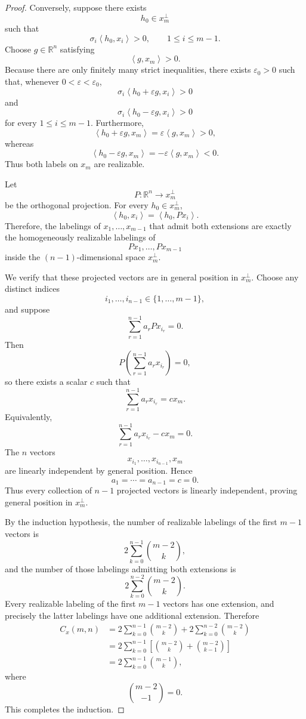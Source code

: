 \documentclass[11pt]{article}
\newcommand{\R}{\mathbb{R}}
\newcommand{\ip}[2]{\left\langle #1,#2\right\rangle}
\newcommand{\1}{\mathbf{1}}
\begin{document}
\begin{proof}
Conversely, suppose there exists
\[
h_0\in x_m^\perp
\]
such that
\[
\sigma_i\ip{h_0}{x_i}>0,
\qquad
1\le i\le m-1.
\]
Choose \(g\in\R^n\) satisfying
\[
\ip{g}{x_m}>0.
\]
Because there are only finitely many strict inequalities, there exists
\(\varepsilon_0>0\) such that, whenever
\(0<\varepsilon<\varepsilon_0\),
\[
\sigma_i\ip{h_0+\varepsilon g}{x_i}>0
\]
and
\[
\sigma_i\ip{h_0-\varepsilon g}{x_i}>0
\]
for every \(1\le i\le m-1\). Furthermore,
\[
\ip{h_0+\varepsilon g}{x_m}
=
\varepsilon\ip{g}{x_m}>0,
\]
whereas
\[
\ip{h_0-\varepsilon g}{x_m}
=
-\varepsilon\ip{g}{x_m}<0.
\]
Thus both labels on \(x_m\) are realizable.

Let
\[
P:\R^n\to x_m^\perp
\]
be the orthogonal projection. For every \(h_0\in x_m^\perp\),
\[
\ip{h_0}{x_i}
=
\ip{h_0}{Px_i}.
\]
Therefore, the labelings of \(x_1,\dots,x_{m-1}\) that admit both
extensions are exactly the homogeneously realizable labelings of
\[
Px_1,\dots,Px_{m-1}
\]
inside the \((n-1)\)-dimensional space \(x_m^\perp\).

We verify that these projected vectors are in general position in
\(x_m^\perp\). Choose any distinct indices
\[
i_1,\dots,i_{n-1}\in\{1,\dots,m-1\},
\]
and suppose
\[
\sum_{r=1}^{n-1}a_rPx_{i_r}=0.
\]
Then
\[
P\left(
\sum_{r=1}^{n-1}a_rx_{i_r}
\right)=0,
\]
so there exists a scalar \(c\) such that
\[
\sum_{r=1}^{n-1}a_rx_{i_r}=cx_m.
\]
Equivalently,
\[
\sum_{r=1}^{n-1}a_rx_{i_r}-cx_m=0.
\]
The \(n\) vectors
\[
x_{i_1},\dots,x_{i_{n-1}},x_m
\]
are linearly independent by general position. Hence
\[
a_1=\cdots=a_{n-1}=c=0.
\]
Thus every collection of \(n-1\) projected vectors is linearly
independent, proving general position in \(x_m^\perp\).

By the induction hypothesis, the number of realizable labelings of the
first \(m-1\) vectors is
\[
2\sum_{k=0}^{n-1}\binom{m-2}{k},
\]
and the number of those labelings admitting both extensions is
\[
2\sum_{k=0}^{n-2}\binom{m-2}{k}.
\]
Every realizable labeling of the first \(m-1\) vectors has one extension,
and precisely the latter labelings have one additional extension.
Therefore
\begin{align*}
C_x(m,n)
&=
2\sum_{k=0}^{n-1}\binom{m-2}{k}
+
2\sum_{k=0}^{n-2}\binom{m-2}{k}
\\
&=
2\sum_{k=0}^{n-1}
\left[
\binom{m-2}{k}
+
\binom{m-2}{k-1}
\right]
\\
&=
2\sum_{k=0}^{n-1}\binom{m-1}{k},
\end{align*}
where
\[
\binom{m-2}{-1}=0.
\]
This completes the induction.
\end{proof}
\end{document}
